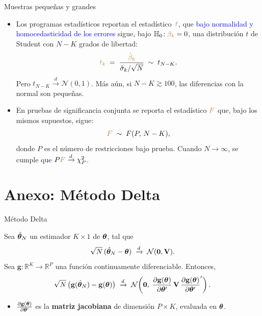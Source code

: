 \documentclass[10pt, xcolor=dvipsnames]{beamer}
\begin{document}
\begin{frame}{Muestras pequeñas y grandes}
\begin{itemize}
    \item Los programas estadísticos reportan el estadístico \(\,\textcolor{brown}{t}\), 
    que \textcolor{blue}{bajo normalidad y homocedasticidad de los errores} sigue, bajo \(\mathbb{H}_{0}\!: \textcolor{brown}{\beta_k}=0\), una distribución \(t\) de Student con \(N-K\) grados de libertad:
    \vspace{-0.5em}
    \[
        \textcolor{brown}{t_k} \;=\; \frac{\textcolor{brown}{\hat{\beta}_k}}{\hat{\sigma}_k/\sqrt{N}} \;\sim\; t_{N-K}.
    \]
    Pero \(t_{N-K} \xrightarrow{d} \mathcal{N}(0,1)\). Más aún, si \(N - K \gtrsim 100\), las diferencias con la normal son pequeñas.
    \medskip
    \pause
    \item En pruebas de significancia conjunta se reporta el estadístico \(\textcolor{brown}{F}\) que, bajo los mismos supuestos, sigue:
    \[
        \textcolor{brown}{F} \;\sim\; F(P,\,N-K),
    \]
    donde \(P\) es el número de restricciones bajo prueba. Cuando \(N \to \infty\), se cumple que \(P \textcolor{brown}{F} \xrightarrow{d} \chi^2_P\).
\end{itemize}
\end{frame}


\section{Anexo: Método Delta}


\begin{frame}{Método Delta}\label{Anexo:MDelta}
\begin{tcolorbox}[colback=white, arc=0mm, boxrule=0.5pt, 
title=\textbf{Teorema: Método Delta}, breakable]
    Sea $\hat{\boldsymbol{\theta}}_N$ un estimador \(K \times 1\) de $\boldsymbol{\theta}$, tal que
    \[
        \sqrt{N}\,(\hat{\boldsymbol{\theta}}_N - \boldsymbol{\theta}) 
        \;\xrightarrow{d}\; \mathcal{N}(\mathbf{0}, \mathbf{V}).
    \]
    Sea $\mathbf{g} : \mathbb{R}^K \to \mathbb{R}^P$ una función continuamente diferenciable. Entonces,
    \[
        \sqrt{N}\,\big(\mathbf{g}(\hat{\boldsymbol{\theta}}_N) - \mathbf{g}(\boldsymbol{\theta})\big)
        \;\xrightarrow{d}\;
        \mathcal{N}\!\left(\mathbf{0},\;
        \frac{\partial \mathbf{g}(\boldsymbol{\theta})}{\partial \boldsymbol{\theta}'} \,\mathbf{V}\,
        \frac{\partial \mathbf{g}(\boldsymbol{\theta})}{\partial \boldsymbol{\theta}'}'\right).
    \]
\end{tcolorbox}

\begin{itemize}
    \item $\frac{\partial \mathbf{g}(\boldsymbol{\theta})}{\partial \boldsymbol{\theta}'}$ es la \textbf{matriz jacobiana} de dimensión \(P \times K\), evaluada en $\boldsymbol{\theta}$.
\end{itemize}
\end{frame}
\end{document}
